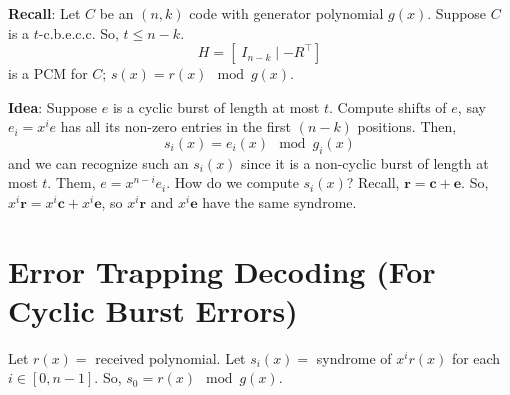 \textbf{Recall}: Let $ C $ be an $ (n,k) $ code with generator polynomial
$ g(x) $. Suppose $ C $ is a $ t $-c.b.e.c.c. So, $ t\leqslant n-k $.
\[ H=\left[ \; I_{n-k}\mid -R^\top \right] \]
is a PCM for $ C $; $ s(x)=r(x)\mod g(x) $.

\textbf{Idea}: Suppose $ e $ is a cyclic burst of length at most $ t $.
Compute shifts of $ e $, say $ e_i=x^i e $ has all its non-zero entries in the first
$ (n-k) $ positions. Then,
\[ s_i(x)=e_i(x)\mod g_i(x) \]
and we can recognize such an $ s_i(x) $ since it is a non-cyclic burst of length
at most $ t $. Them, $ e=x^{n-i}e_i $. How do we compute $ s_i(x) $? Recall,
$ \bm{r}=\bm{c}+\bm{e} $. So, $ x^i \bm{r}=x^i\bm{c}+x^i\bm{e} $, so
$ x^i \bm{r} $ and $ x^i\bm{e} $ have the same syndrome.

\section{Error Trapping Decoding (For Cyclic Burst Errors)}
Let $ r(x)= $ received polynomial. Let $ s_i(x)= $ syndrome of $ x^i r(x) $ for
each $ i\in[0,n-1] $. So, $ s_0=r(x)\mod g(x) $.

\begin{algbox}
    \begin{algorithm}[H]
        \caption{}
        \Input{}
        \Output{}

    \end{algorithm}
\end{algbox}

